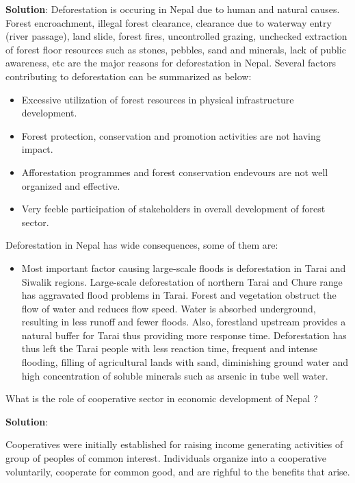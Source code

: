 \documentclass[
]{book}
\newcommand{\question}{\item}
\newenvironment{solution}{ {\bfseries Solution}:}{}
\begin{document}
\begin{questions}
\begin{solution}
Deforestation is occuring in Nepal due to human and natural causes. Forest encroachment, illegal forest clearance, clearance due to waterway entry (river passage), land slide, forest fires, uncontrolled grazing, unchecked extraction of forest floor resources such as stones, pebbles, sand and minerals, lack of public awareness, etc are the major reasons for deforestation in Nepal. Several factors contributing to deforestation can be summarized as below:
\begin{itemize}
\item Excessive utilization of forest resources in physical infrastructure development.
\item Forest protection, conservation and promotion activities are not having impact.
\item Afforestation programmes and forest conservation endevours are not well organized and effective.
\item Very feeble participation of stakeholders in overall development of forest sector.
\end{itemize}

Deforestation in Nepal has wide consequences, some of them are:

\begin{itemize}
\item Most important factor causing large-scale floods is deforestation in Tarai and Siwalik regions. Large-scale deforestation of northern Tarai and Chure range has aggravated flood problems in Tarai. Forest and vegetation obstruct the flow of water and reduces flow speed. Water is absorbed underground, resulting in less runoff and fewer floods. Also, forestland upstream provides a natural buffer for Tarai thus providing more response time. Deforestation has thus left the Tarai people with less reaction time, frequent and intense flooding, filling of agricultural lands with sand, diminishing ground water and high concentration of soluble minerals such as arsenic in tube well water.
\end{itemize}

\end{solution}

\question What is the role of cooperative sector in economic development of Nepal ?

\begin{solution}

Cooperatives were initially established for raising income generating activities of group of peoples of common interest. Individuals organize into a cooperative voluntarily, cooperate for common good, and are righful to the benefits that arise.


\end{solution}
\end{questions}
\end{document}
